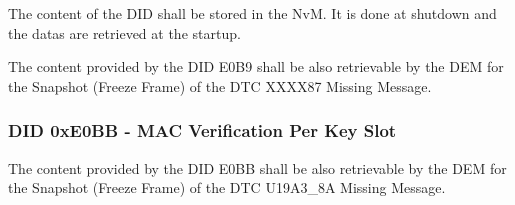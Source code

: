 {}


The content of the DID shall be stored in the NvM. It is done at shutdown and the datas are retrieved at the startup.

{}


The content provided by the DID E0B9 shall be also retrievable by the DEM for the Snapshot (Freeze Frame) of the DTC XXXX87 Missing Message.

{}

\subsubsection{DID 0xE0BB - MAC Verification Per Key Slot}
\label{sec:dyne0bb}

The content provided by the DID E0BB shall be also retrievable by the DEM for the Snapshot (Freeze Frame) of the DTC U19A3_8A Missing Message.

{}

